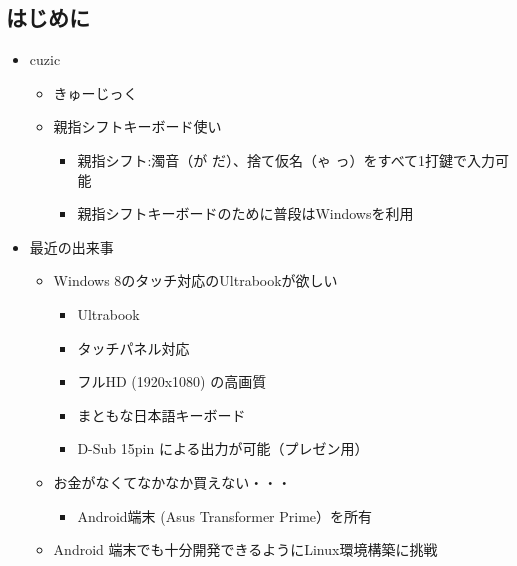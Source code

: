 \documentclass[mingoth,a4paper]{jsarticle}
\begin{document}
\subsection{はじめに}
\begin{itemize}
 \item cuzic
       \begin{itemize}
        \item きゅーじっく
        \item 親指シフトキーボード使い
              \begin{itemize}
               \item 親指シフト:濁音（が だ）、捨て仮名（ゃ っ）をすべて1打鍵で入力可能
               \item 親指シフトキーボードのために普段はWindowsを利用
              \end{itemize}
       \end{itemize}
 \item 最近の出来事
       \begin{itemize}
        \item Windows 8のタッチ対応のUltrabookが欲しい
              \begin{itemize}
               \item Ultrabook
               \item タッチパネル対応
               \item フルHD (1920x1080) の高画質
               \item まともな日本語キーボード
               \item D-Sub 15pin による出力が可能（プレゼン用）
              \end{itemize}
        \item お金がなくてなかなか買えない・・・
              \begin{itemize}
               \item Android端末 (Asus Transformer Prime）を所有
              \end{itemize}
        \item Android 端末でも十分開発できるようにLinux環境構築に挑戦
       \end{itemize}
\end{itemize}
\end{document}
